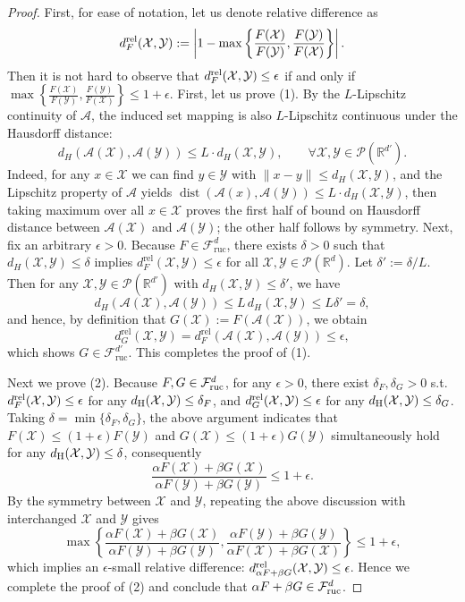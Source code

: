 \documentclass{article}
\newcommand{\cX}{\mathcal{X}}
\newcommand{\cY}{\mathcal{Y}}
\newcommand{\cA}{\mathcal{A}}
\newcommand{\cF}{\mathcal{F}}
\begin{document}
\begin{proof}
First, for ease of notation, let us denote relative difference as 
$$d_{F}^{\rm rel}(\cX,\cY): = \left|1-\max\left\{\frac{F(\cX)}{F(\cY)},\frac{F(\cY)}{F(\cX)}\right\}\right|.$$
Then it is not hard to observe that $d_{F}^{\rm rel}(\cX,\cY)\leq \epsilon$ if and only if  $\max\left\{\frac{F(\cX)}{F(\cY)},\frac{F(\cY)}{F(\cX)}\right\}\leq 1+\epsilon$. First, let us  prove (1). By the $L$-Lipschitz continuity of $\mathcal{A}$, the induced set mapping is also
$L$-Lipschitz continuous under the Hausdorff distance:
\[
    d_H(\mathcal{A}(\cX),\mathcal{A}(\cY))
    \le L\cdot d_H(\cX,\cY),
    \qquad \forall \cX,\cY \in \mathcal{P}(\mathbb{R}^{d'}).
\]
Indeed, for any $x\in\cX$ we can find $y\in\cY$ with $\|x-y\|\le d_H(\cX,\cY)$,
and the Lipschitz property of $\mathcal{A}$ yields
$\operatorname{dist}(\mathcal{A}(x),\mathcal{A}(\cY))
\le L\cdot d_H(\cX,\cY)$, then taking maximum over all $x\in\mathcal{X}$ proves the first half of bound on Hausdorff distance between $\cA(\cX)$ and $\cA(\cY)$; the other half  follows by symmetry.
Next, fix an arbitrary $\epsilon>0$.
Because $F\in\cF_{\mathrm{ruc}}^d$, there exists $\delta>0$ such that
$d_H(\cX,\cY)\le\delta$ implies
$d_F^{\mathrm{rel}}(\cX,\cY)\le\epsilon$ for all
$\cX,\cY\in\mathcal{P}(\mathbb{R}^d)$.
Let $\delta' := \delta/L$.
Then for any $\cX,\cY\in\mathcal{P}(\mathbb{R}^{d'})$ with
$d_H(\cX,\cY)\le\delta'$, we have
\[
    d_H(\mathcal{A}(\cX),\mathcal{A}(\cY))
    \le L\, d_H(\cX,\cY)
    \le L\delta' = \delta,
\]
and hence, by definition that $G(\cX):=F(\mathcal{A}(\cX))$, we obtain
\[
    d_G^{\mathrm{rel}}(\cX,\cY)
    = d_F^{\mathrm{rel}}(\mathcal{A}(\cX),\mathcal{A}(\cY))
    \le \epsilon,
\]
which shows $G\in\cF_{\mathrm{ruc}}^{d'}$.  This completes the proof of (1).

Next we prove (2). Because $F,G\in\cF_{\rm ruc}^{d}$, for any $\epsilon>0$, there exist $\delta_F,\delta_G>0$ s.t. 
$d_{F}^{\rm rel}(\cX,\cY)\leq\epsilon$ for any $d_{\rm H}(\cX,\cY)\leq \delta_F$, and $d_{G}^{\rm rel}(\cX,\cY)\leq\epsilon$ for any $d_{\rm H}(\cX,\cY)\leq \delta_G$. Taking $\delta = \min\{\delta_F,\delta_G\}$, the above argument indicates that 
$F(\cX)\leq (1+\epsilon)F(\cY)$ and $G(\cX)\leq (1+\epsilon)G(\cY)$ simultaneously hold for any $d_{\rm H}(\cX,\cY)\leq \delta$, consequently
$$\frac{\alpha F(\cX)+\beta G(\cX)}{\alpha F(\cY)+\beta G(\cY)}\leq 1+\epsilon.$$
By the symmetry between $\cX$ and $\cY$,   repeating the above discussion with interchanged $\cX$ and $\cY$ gives 
$$\max\left\{\frac{\alpha F(\cX)+\beta G(\cX)}{\alpha F(\cY)+\beta G(\cY)},\frac{\alpha F(\cY)+\beta G(\cY)}{\alpha F(\cX)+\beta G(\cX)}\right\}\leq 1+\epsilon,$$
which implies an $\epsilon$-small relative difference: $d_{\alpha F+\beta G}^{\rm rel}(\cX,\cY)\leq\epsilon$. Hence we complete  the proof of (2) and conclude that $\alpha F+\beta G\in \cF_{\rm ruc}^{d}$.  


\end{proof}
\end{document}
